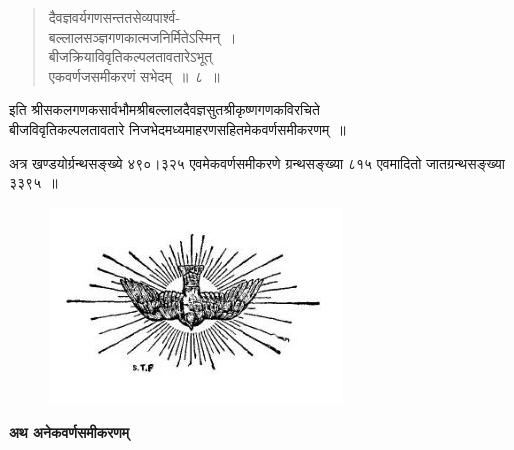 \documentclass[11pt, openany]{book}
\begin{document}
\begin{quote}
    \qt
 दैवज्ञवर्यगणसन्ततसेव्यपार्श्व-\\

\vspace{-7mm}
\hspace{1cm} बल्लालसञ्ज्ञगणकात्मजनिर्मितेऽस्मिन्~। \\

\vspace{-7mm}
 बीजक्रियाविवृतिकल्पलतावतारेऽभूत् \\

\vspace{-7mm}
\hspace{1cm} एकवर्णजसमीकरणं सभेदम्~॥~८~॥~
\end{quote}

\begin{center}
 इति श्रीसकलगणकसार्वभौमश्रीबल्लालदैवज्ञसुतश्रीकृष्णगणकविरचिते \\
 बीजविवृतिकल्पलतावतारे निजभेदमध्यमाहरणसहितमेकवर्णसमीकरणम्~॥ 
\end{center}

 अत्र खण्डयोर्ग्रन्थसङ्ख्ये ४९०।३२५ एवमेकवर्णसमीकरणे ग्रन्थसङ्ख्या
८१५ एवमादितो जातग्रन्थसङ्ख्या ३३९५~॥
\begin{figure}[h!]
    \centering
    \includegraphics[scale=0.7]{Graphics/Capture.JPG}
\end{figure}
\newpage
 \label{anekavarna}
\begin{center}
    \textbf{\LARGE  अथ अनेकवर्णसमीकरणम्}
\end{center}
\thispagestyle{empty}
\end{document}
